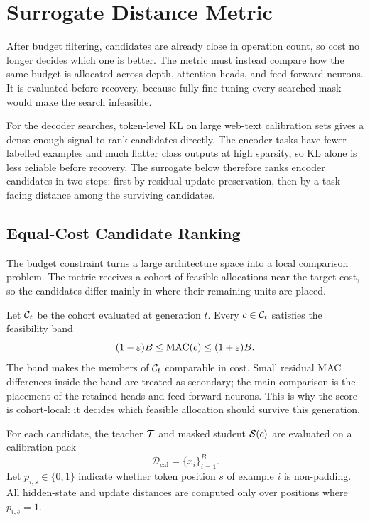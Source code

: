 \section{Surrogate Distance Metric}
\label{chap:metric}

After budget filtering, candidates are already close in operation count, so cost no longer decides which one is better. The metric must instead compare how the same budget is allocated across depth, attention heads, and feed-forward neurons. It is evaluated before recovery, because fully fine tuning every searched mask would make the search infeasible.

For the decoder searches, token-level KL on large web-text calibration sets gives a dense enough signal to rank candidates directly. The encoder tasks have fewer labelled examples and much flatter class outputs at high sparsity, so KL alone is less reliable before recovery. The surrogate below therefore ranks encoder candidates in two steps: first by residual-update preservation, then by a task-facing distance among the surviving candidates.

\subsection{Equal-Cost Candidate Ranking}

The budget constraint turns a large architecture space into a local comparison problem. The metric receives a cohort of feasible allocations near the target cost, so the candidates differ mainly in where their remaining units are placed.

Let $\mathcal{C}_t$ be the cohort evaluated at generation $t$. Every $c \in \mathcal{C}_t$ satisfies the feasibility band
\begin{equation}
(1-\varepsilon)B
\le
\mathrm{MAC}(c)
\le
(1+\varepsilon)B .
\end{equation}
The band makes the members of $\mathcal{C}_t$ comparable in cost. Small residual MAC differences inside the band are treated as secondary; the main comparison is the placement of the retained heads and feed forward neurons. This is why the score is cohort-local: it decides which feasible allocation should survive this generation.

For each candidate, the teacher $\mathcal{T}$ and masked student $\mathcal{S}(c)$ are evaluated on a calibration pack
\[
\mathcal{D}_{\mathrm{cal}}
= \{x_i\}_{i=1}^{B}.
\]
Let $p_{i,s}\in\{0,1\}$ indicate whether token position $s$ of example $i$ is non-padding. All hidden-state and update distances are computed only over positions where $p_{i,s}=1$.


